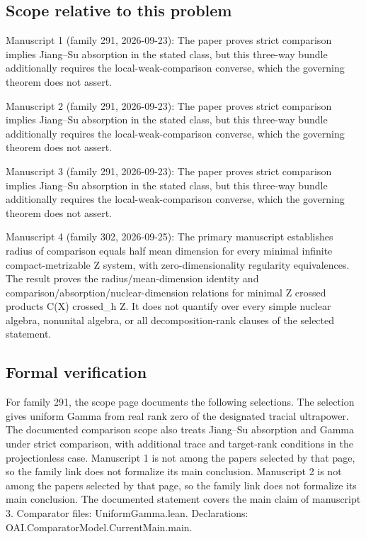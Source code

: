 \documentclass[11pt]{article}
\begin{document}
\subsection{Scope relative to this problem}
Manuscript 1 (family 291, 2026-09-23): The paper proves strict comparison implies Jiang–Su absorption in the stated class, but this three-way bundle additionally requires the local-weak-comparison converse, which the governing theorem does not assert.

Manuscript 2 (family 291, 2026-09-23): The paper proves strict comparison implies Jiang–Su absorption in the stated class, but this three-way bundle additionally requires the local-weak-comparison converse, which the governing theorem does not assert.

Manuscript 3 (family 291, 2026-09-23): The paper proves strict comparison implies Jiang–Su absorption in the stated class, but this three-way bundle additionally requires the local-weak-comparison converse, which the governing theorem does not assert.

Manuscript 4 (family 302, 2026-09-25): The primary manuscript establishes radius of comparison equals half mean dimension for every minimal infinite compact-metrizable Z system, with zero-dimensionality regularity equivalences. The result proves the radius/mean-dimension identity and comparison/absorption/nuclear-dimension relations for minimal Z crossed products C(X) crossed\_h Z. It does not quantify over every simple nuclear algebra, nonunital algebra, or all decomposition-rank clauses of the selected statement.

\subsection{Formal verification}
For family 291, the scope page documents the following selections. The selection gives uniform Gamma from real rank zero of the designated tracial ultrapower. The documented comparison scope also treats Jiang--Su absorption and Gamma under strict comparison, with additional trace and target-rank conditions in the projectionless case. Manuscript 1 is not among the papers selected by that page, so the family link does not formalize its main conclusion. Manuscript 2 is not among the papers selected by that page, so the family link does not formalize its main conclusion. The documented statement covers the main claim of manuscript 3. Comparator files: UniformGamma.lean. Declarations: OAI.ComparatorModel.CurrentMain.main.
\end{document}
